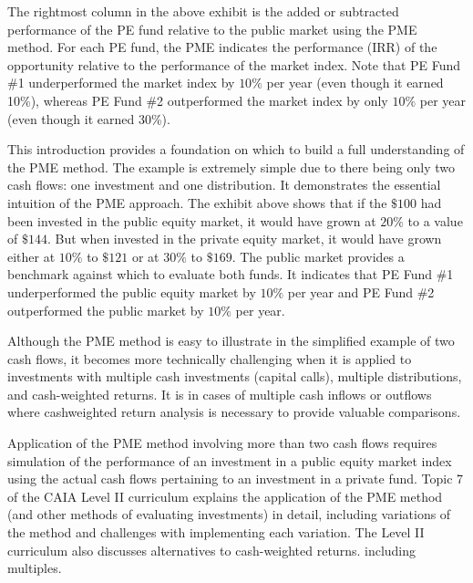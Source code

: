 \documentclass[11pt]{article}
\begin{document}
The rightmost column in the above exhibit is the added or subtracted performance of the PE fund relative to the public market using the PME method. For each PE fund, the PME indicates the performance (IRR) of the opportunity relative to the performance of the market index. Note that PE Fund \#1 underperformed the market index by $10 \%$ per year (even though it earned 10\%), whereas PE Fund \#2 outperformed the market index by only $10 \%$ per year (even though it earned 30\%).

This introduction provides a foundation on which to build a full understanding of the PME method. The example is extremely simple due to there being only two cash flows: one investment and one distribution. It demonstrates the essential intuition of the PME approach. The exhibit above shows that if the $\$ 100$ had been invested in the public equity market, it would have grown at $20 \%$ to a value of $\$ 144$. But when invested in the private equity market, it would have grown either at $10 \%$ to $\$ 121$ or at $30 \%$ to $\$ 169$. The public market provides a benchmark against which to evaluate both funds. It indicates that PE Fund \#1 underperformed the public equity market by $10 \%$ per year and PE Fund \#2 outperformed the public market by $10 \%$ per year.

Although the PME method is easy to illustrate in the simplified example of two cash flows, it becomes more technically challenging when it is applied to investments with multiple cash investments (capital calls), multiple distributions, and cash-weighted returns. It is in cases of multiple cash inflows or outflows where cashweighted return analysis is necessary to provide valuable comparisons.

Application of the PME method involving more than two cash flows requires simulation of the performance of an investment in a public equity market index using the actual cash flows pertaining to an investment in a private fund. Topic 7 of the CAIA Level II curriculum explains the application of the PME method (and other methods of evaluating investments) in detail, including variations of the method and challenges with implementing each variation. The Level II curriculum also discusses alternatives to cash-weighted returns. including multiples.
\end{document}
